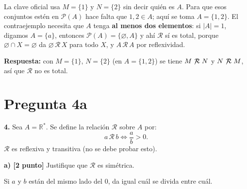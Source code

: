 \documentclass[11pt]{article}
\newcommand{\R}{\mathcal{R}}
\newcommand{\nR}{\mathrel{\not\!\mathcal{R}}}
\newcommand{\hl}[1]{\colorbox{green!35}{#1}}
\begin{document}
\begin{nota}
La clave oficial usa $M=\{1\}$ y $N=\{2\}$ sin decir quién es $A$. Para que esos conjuntos estén en $\mathcal P(A)$ hace falta que $1,2\in A$; aquí se toma $A=\{1,2\}$. El contraejemplo necesita que $A$ tenga \textbf{al menos dos elementos}: si $|A|=1$, digamos $A=\{a\}$, entonces $\mathcal P(A)=\{\varnothing,A\}$ y ahí $\R$ sí es total, porque $\varnothing\cap X=\varnothing$ da $\varnothing\,\R\,X$ para todo $X$, y $A\,\R\,A$ por reflexividad.
\end{nota}

\textbf{Respuesta:} con $M=\{1\}$, $N=\{2\}$ (en $A=\{1,2\}$) se tiene $M\nR N$ y $N\nR M$, así que $\R$ no es total.

\clearpage
\section*{Pregunta 4a}

\textbf{4.} Sea $A=\mathbb R^*$. Se define la relación $\R$ sobre $A$ por:
\[
a\,\R\,b\iff\frac ab>0.
\]
$\R$ es reflexiva y transitiva (no se debe probar esto).

\textbf{a) [2 punto]} Justifique que $\R$ es \hl{simétrica}.

\begin{center}

{\small Si $a$ y $b$ están del mismo lado del $0$, da igual cuál se divida entre cuál.}
\end{center}

\end{document}
